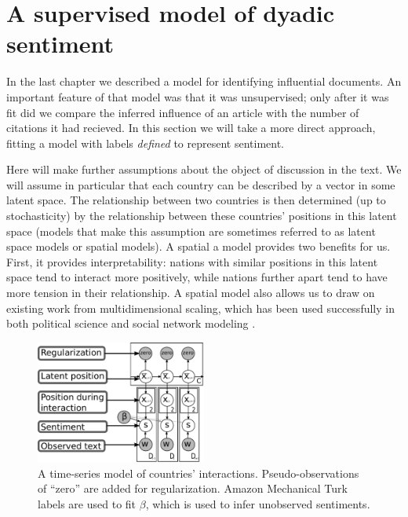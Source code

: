 \section{A supervised model of dyadic sentiment}

\label{section:foreign_relations_supervised_model}

In the last chapter we described a model for identifying influential
documents.  An important feature of that model was that it was
unsupervised; only after it was fit did we compare the inferred
influence of an article with the number of citations it had recieved.
In this section we will take a more direct approach, fitting a
model with labels \emph{defined} to represent sentiment.

Here will make further assumptions about the object of discussion in
the text. We will assume in particular that each country can be
described by a vector in some latent space.  The relationship between
two countries is then determined (up to stochasticity) by the
relationship between these countries' positions in this latent space
(models that make this assumption are sometimes referred to as latent
space models or spatial models).  A spatial a model provides two
benefits for us. First, it provides interpretability: nations with similar
positions in this latent space tend to interact more positively, while
nations further apart tend to have more tension in their relationship.
A spatial model also allows us to draw on existing work from
multidimensional scaling, which has been used successfully in both
political science \cite{martin:2002,jackman:2001} and social network
modeling \cite{hoff:2002,chang:2009}.

\begin{figure}
  \center
  \vspace{-55pt}
  \includegraphics[width=0.5\textwidth]{chapter_foreign_relations/figures/countries_gm.pdf}
  \caption{A time-series model of countries' interactions.
    Pseudo-observations of ``zero'' are added for regularization.
    Amazon Mechanical Turk labels are used to fit $\beta$, which is
    used to infer unobserved sentiments.}
  \label{figure:gm}
\end{figure}

